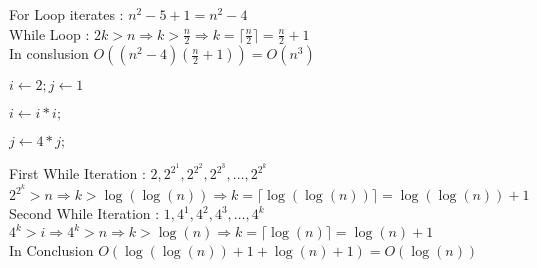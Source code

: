 For Loop iterates : \(n^2 - 5+1 = \boxed{n^2-4}\)\\[0.35cm]
While Loop :
\(2k>n \Rightarrow k>\frac{n}{2} \Rightarrow k = \lceil \frac{n}{2} \rceil = \boxed{\frac{n}{2} + 1}\)\\[0.35cm]

In conslusion \(O((n^2-4)(\frac{n}{2} + 1)) = O(n^3)\)

\vspace{1cm}

\begin{algorithm}[ht]
\caption{}
\begin{algorithmic}
\State \(i \gets 2;j\gets 1\)

\State \(i \gets i*i;\)
\EndWhile

\State \(j \gets 4*j;\)
\EndWhile

\end{algorithmic}
\end{algorithm}

First While Iteration :
\(2,2^{2^{1}},2^{2^{2}}, 2^{2^{3}},\dots,2^{2^{k}}\)\\[0.15cm]
\(2^{2^k} > n \Rightarrow k > \log(\log(n)) \Rightarrow k = \lceil \log(\log(n)) \rceil = \boxed{\log(\log(n)) + 1}\)\\[0.35cm]

Second While Iteration :
\(1,4^1,4^2,4^3,\dots,4^k\)\\[0.15cm]
\(4^k > i \Rightarrow 4^k > n \Rightarrow k>\log(n) \Rightarrow  k = \lceil \log(n) \rceil = \boxed{\log(n) + 1} \)\\[0.35cm]

In Conclusion \(O(\log(\log(n))+1+\log(n)+1) = O(\log(n))\)

